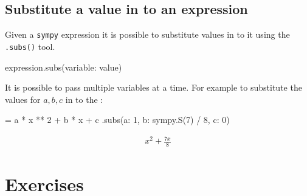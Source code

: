 \subsection{Substitute a value in to an expression}
\label{sec:substite_a_value_in_to_an_expression}

Given a \texttt{sympy} expression it is possible to substitute values in to it using
the \texttt{.subs()} tool.

\begin{api}
expression.subs({variable: value})
\end{api}

It is possible to pass multiple variables at a time.
For example to substitute the values for \(a, b, c\) in to the :

\begin{pyin}
 = a * x ** 2 + b * x + c
.subs({a: 1, b: sympy.S(7) / 8, c: 0})
\end{pyin}

\begin{equation*}
\begin{split}\displaystyle x^{2} + \frac{7 x}{8}\end{split}
\end{equation*}

\section{Exercises}

